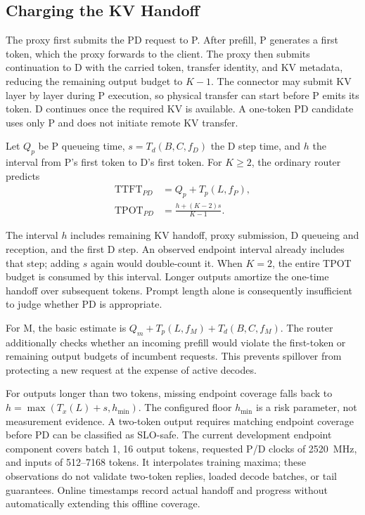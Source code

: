 \documentclass[11pt,a4paper,twocolumn]{article}
\newcommand{\TTFT}{\mathrm{TTFT}}
\newcommand{\TPOT}{\mathrm{TPOT}}
\begin{document}
\subsection{Charging the KV Handoff}

The proxy first submits the PD request to P. After prefill,
P generates a first token, which the proxy forwards to the
client. The proxy then submits continuation to D with the
carried token, transfer identity, and KV metadata, reducing
the remaining output budget to $K-1$. The connector may
submit KV layer by layer during P execution, so physical
transfer can start before P emits its token. D continues
once the required KV is available. A one-token PD candidate
uses only P and does not initiate remote KV transfer.

\begin{samepage}
Let $Q_p$ be P queueing time,
$s=T_d(B,C,f_D)$ the D step time, and $h$ the interval
from P's first token to D's first token. For $K\ge2$, the
ordinary router predicts
\begin{align}
\TTFT_{PD}&=Q_p+T_p(L,f_P),\\
\TPOT_{PD}&=\frac{h+(K-2)s}{K-1}.
\label{eq:handoff}
\end{align}
\end{samepage}
The interval $h$ includes remaining KV handoff, proxy
submission, D queueing and reception, and the first D step.
An observed endpoint interval already includes that step;
adding $s$ again would double-count it. When $K=2$, the
entire TPOT budget is consumed by this interval. Longer
outputs amortize the one-time handoff over subsequent tokens.
Prompt length alone is consequently insufficient to judge
whether PD is appropriate.

For M, the basic estimate is
$Q_m+T_p(L,f_M)+T_d(B,C,f_M)$. The router additionally
checks whether an incoming prefill would violate the
first-token or remaining output budgets of incumbent
requests. This prevents spillover from protecting a new
request at the expense of active decodes.

For outputs longer than two tokens, missing endpoint
coverage falls back to
$h=\max(T_x(L)+s,h_{\min})$.
The configured floor $h_{\min}$ is a risk parameter, not
measurement evidence. A two-token output requires matching
endpoint coverage before PD can be classified as SLO-safe.
The current development endpoint component covers batch 1,
16 output tokens, requested P/D clocks of 2520~MHz, and
inputs of 512--7168 tokens. It interpolates training maxima;
these observations do not validate two-token replies,
loaded decode batches, or tail guarantees. Online timestamps
record actual handoff and progress without automatically
extending this offline coverage.
\end{document}
